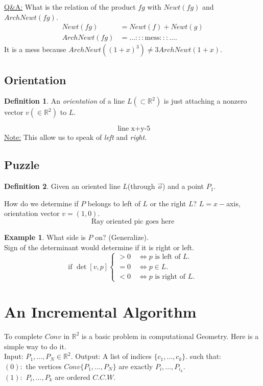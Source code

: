 \documentclass[]{article}
\theoremstyle{definition}
\newtheorem*{defn}{Definition}
\newtheorem{ex}{Example}[section]
\newcommand{\lecture}[1]{\marginpar{{\footnotesize $\leftarrow$ \underline{#1}}}}
\begin{document}
			\underline{Q\&A:} What is the relation of the product $fg$ with $Newt(fg)$ and $ArchNewt(fg)$.
			\begin{align*}
			Newt(fg) &= Newt(f)+Newt(g) \\
			ArchNewt(fg) &= \ldots:::\text{mess}:::\ldots.
			\end{align*}
			It is a mess because $ArchNewt((1+x)^3) \neq 3ArchNewt(1+x).$
			\subsection{Orientation} \lecture{June 27, 2017}
			\begin{defn}An \emph{orientation} of a line $L (\subset \mathbb{R}^{2})$ is just attaching a nonzero vector $v(\in\mathbb{R}^2)$ to $L$.
			\end{defn}
			\[
			\text{ line x+y-5}
			\]
			\underline{Note:} This allow us to speak of \emph{left} and \emph{right}.
			\subsection{Puzzle}
			\begin{defn}
			Given an oriented line $L$(through $\overrightarrow{o}$) and a point $P_1$.
			\end{defn}
			How do we determine if $P$ belongs to left of $L$ or the right $L$?
			$L=x-$axis, orientation vector $v=(1,0).$
			\[\text{Ray oriented pic goes here}\]
			\begin{ex} What side is $P$ on? (Generalize).\\
			Sign of the determinant would determine if it is right or left.
			\begin{equation*}
			\text{if }\det[v,p]\begin{cases}
			>0 \quad \iff p\text{ is left of } L.\\
			=0 \quad \iff p\in L.\\
			<0 \quad \iff p\text{ is right of } L.
			\end{cases}
			\end{equation*}
			\end{ex}
			\section{An Incremental Algorithm}
			To complete $Conv$ in $\mathbb{R}^2$ is a basic problem in computational Geometry. Here is a simple way to do it.\\
			Input: $P_1,\ldots,P_N \in \mathbb{R}^2$.
			Output: A list of indices $\{c_1,\ldots,c_k\}$.
			such that:\\
			$(0):$ the vertices $Conv\{P_1,\ldots,P_N\}$ are exactly $P_i,\ldots,P_{i_k}.$\\
			$(1):$ $P_i,\ldots,P_k$ are ordered $C.C.W.$\\
			
\end{document}
